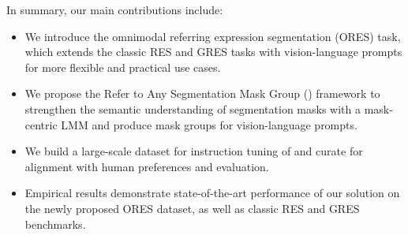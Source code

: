 In summary, our main contributions include:
\begin{itemize}[leftmargin=*, noitemsep, nolistsep]
\item We introduce the omnimodal referring expression segmentation (ORES) task, which extends the classic RES and GRES tasks with vision-language prompts for more flexible and practical use cases.
\item We propose the Refer to Any Segmentation Mask Group (\ourmodel) framework to strengthen the semantic understanding of segmentation masks with a mask-centric LMM and produce mask groups for vision-language prompts.
\item We build a large-scale dataset \ourlargedata for instruction tuning of \ourmodel and curate \ourgooddata for alignment with human preferences and evaluation.
\item Empirical results demonstrate state-of-the-art performance of our solution on the newly proposed ORES dataset, as well as classic RES and GRES benchmarks.
\end{itemize}
